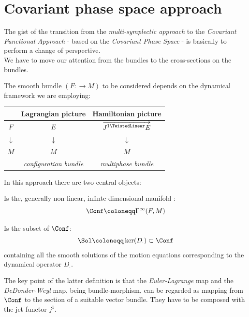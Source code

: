 \documentclass[a4paper,12pt]{scrartcl}  %
\renewcommand{\LinDualJet}{ \overrightarrow{J^{1 \TwistedLinear}E} }
\begin{document}
\section{Covariant phase space approach}
The gist of the transition from the \emph{multi-symplectic approach} to the \emph{Covariant Functional Approach} - based on the \emph{Covariant Phase Space} - is basically to perform a change of perspective.\\
We have to move our attention from the bundles to the cross-sections on the bundles.

The smooth bundle $(F:\rightarrow M)$ to be considered depends on the dynamical framework we are employing:

\begin{center}
\begin{tabular}{|c|c|c|}
	\hline
	 & Lagrangian picture & Hamiltonian picture \\
	\hline
	$F$		&	$E$		&	$\LinDualJet$	\\
	$\downarrow$ & $\downarrow$ & $\downarrow$ \\
	$M$ & $M$ & $M$ \\
	    & \emph{configuration bundle} & \emph{multiphase bundle} \\
	\hline
\end{tabular}
\end{center}

In this approach there are two central objects:

	\begin{definition}\label{Def:ConfSpace}
		Is the, generally non-linear, infinte-dimensional manifold :
		\begin{displaymath}
			\Conf \coloneqq \Gamma^\infty(F,M)
		\end{displaymath}
	\end{definition}
	
	\begin{definition}\label{Def:SolSpace}
		Is the subset of $\Conf$:
		\begin{displaymath}
			\Sol \coloneqq \ker(D_\cdot) \subset \Conf
		\end{displaymath}
		containing all the smooth solutions of the motion equations corresponding to the  dynamical operator $D_\cdot$.
	\end{definition}

The key point of the latter definition is that the \emph{Euler-Lagrange} map and the \emph{DeDonder-Weyl} map, being bundle-morphism, can be regarded as mapping from $\Conf$ to the section of a suitable vector bundle.
They have to be composed with the jet functor $j^1$.
\end{document}
